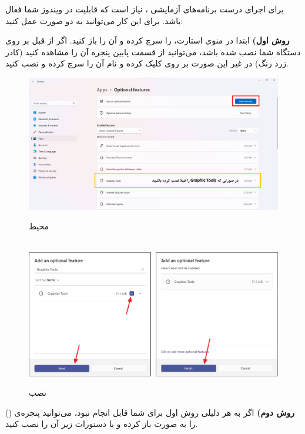 {
    \Large
    برای اجرای درست برنامه‌های آزمایشی ، نیاز است که قابلیت  در ویندوز شما فعال باشد.
    برای این کار می‌توانید به دو صورت عمل کنید:

    \textbf{روش اول)}
    ابتدا در منوی استارت،  را سرچ کرده و آن را باز کنید.
    اگر  از قبل بر روی دستگاه شما نصب شده باشد، می‌توانید از قسمت پایین پنجره آن را مشاهده کنید (کادر زرد رنگ)
    در غیر این صورت بر روی  کلیک کرده و نام آن را سرچ کرده و نصب کنید.

    \begin{figure}[H]
        \centering
        \setlength{\belowcaptionskip}{-10pt}
        \includegraphics[width=\textwidth]{Images/1.Intro.4.1.png}
        \caption*{محیط }
        \\[25pt]
        \includegraphics[width=\textwidth]{Images/1.Intro.4.2.png}
        \caption*{نصب }
    \end{figure}

    \textbf{روش دوم)}
    اگر به هر دلیلی روش اول برای شما قابل انجام نبود، می‌توانید پنجره‌ی  () را به صورت  باز کرده و با دستورات زیر آن را نصب کنید.

}

